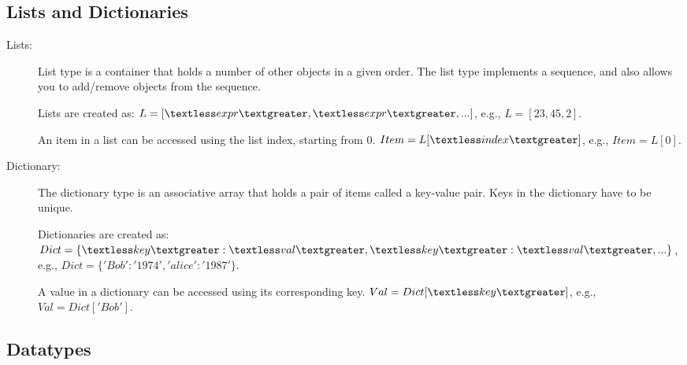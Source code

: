 \subsection{Lists and Dictionaries}
\begin{description}
\item [Lists:] List type is a container that holds a number of other objects
 in a given order. The list type implements a sequence, and also allows you 
 to add/remove objects from the sequence.

Lists are created as:
$L = [\textless expr \textgreater, \textless expr \textgreater, ...]$, e.g., $L = [23, 45, 2]$.

An item in a list can be accessed using the list index, starting from 0.
$Item = L [ \textless index\textgreater]$, e.g., $Item = L [0]$.



\item [Dictionary:] The dictionary type is an associative array that holds 
a pair of items called a key-value pair. Keys in the dictionary have to be unique.

Dictionaries are created as:
$Dict = \{ \textless key \textgreater :  \textless val\textgreater,  \textless key \textgreater : \textless val \textgreater, ...\}$, e.g., 
$Dict = \{ 'Bob' : '1974', 'alice' : '1987'\}$.


A value in a dictionary can be accessed using its corresponding key.
$Val = Dict [ \textless key\textgreater]$, e.g., $Val = Dict ['Bob']$.
\end{description}



\subsection{Datatypes}

